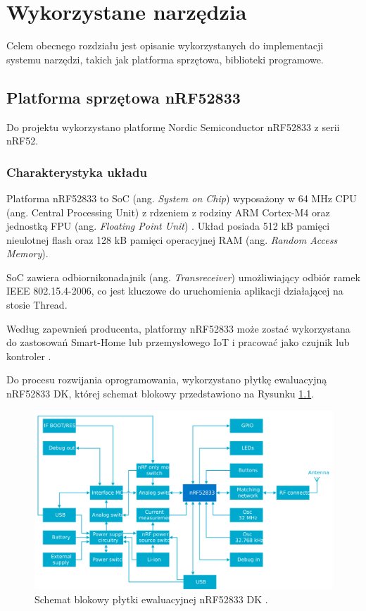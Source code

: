 \chapter{Wykorzystane narzędzia}
\label{cha:narzedzia}

Celem obecnego rozdziału jest opisanie wykorzystanych do implementacji systemu narzędzi, takich jak platforma sprzętowa, biblioteki programowe.

\section{Platforma sprzętowa nRF52833}

Do projektu wykorzystano platformę Nordic Semiconductor nRF52833 z serii nRF52.

\subsection{Charakterystyka układu}

    Platforma nRF52833 to SoC (ang. \textit{System on Chip}) wyposażony w 64 MHz CPU (ang. Central Processing Unit) z rdzeniem z rodziny ARM Cortex-M4 oraz jednostką FPU (ang. \textit{Floating Point Unit}) \cite{nrf52833-characteristics}.
    Układ posiada 512 kB pamięci nieulotnej flash oraz 128 kB pamięci operacyjnej RAM (ang. \textit{Random Access Memory}).

    SoC zawiera odbiornikonadajnik (ang. \textit{Transreceiver}) umożliwiający odbiór ramek IEEE 802.15.4-2006, co jest kluczowe do uruchomienia aplikacji działającej na stosie Thread.

    Według zapewnień producenta, platformy nRF52833 może zostać wykorzystana do zastosowań Smart-Home lub przemysłowego IoT i pracować jako czujnik lub kontroler \cite{nrf52833-characteristics}.

    Do procesu rozwijania oprogramowania, wykorzystano płytkę ewaluacyjną nRF52833 DK, której schemat blokowy przedstawiono na Rysunku \ref{fig:nrf8233-block-diagram}.

    \begin{figure}[H]
        \centering
        \includegraphics[width=0.8\linewidth]{graphics/external/nrf52833DK_block_diagram.jpg}
        \caption{Schemat blokowy płytki ewaluacyjnej nRF52833 DK \cite{nrf52833-diagram}.}
        \label{fig:nrf8233-block-diagram}
    \end{figure}

